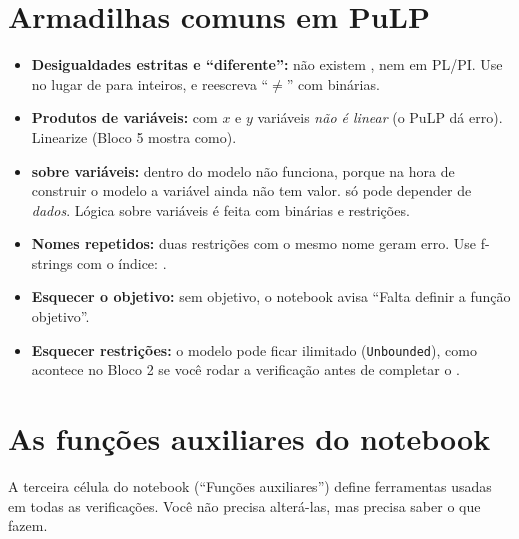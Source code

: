 \section{Armadilhas comuns em PuLP}

\begin{atencao}
\begin{itemize}
  \item \textbf{Desigualdades estritas e ``diferente'':} não existem \py{<}, \py{>} nem \py{!=} em PL/PI. Use
   no lugar de  para inteiros, e reescreva ``$\ne$'' com binárias.
  \item \textbf{Produtos de variáveis:}  com $x$ e $y$ variáveis \emph{não é linear} (o PuLP dá erro).
  Linearize (Bloco 5 mostra como).
  \item \textbf{ sobre variáveis:}  dentro do modelo não funciona, porque na hora de
  construir o modelo a variável ainda não tem valor.  só pode depender de \emph{dados}. Lógica sobre variáveis
  é feita com binárias e restrições.
  \item \textbf{Nomes repetidos:} duas restrições com o mesmo nome geram erro. Use f-strings com o índice:
  .
  \item \textbf{Esquecer o objetivo:} sem objetivo, o notebook avisa ``Falta definir a função objetivo''.
  \item \textbf{Esquecer restrições:} o modelo pode ficar ilimitado (\texttt{Unbounded}), como acontece no Bloco 2
  se você rodar a verificação antes de completar o .
\end{itemize}
\end{atencao}

\section{As funções auxiliares do notebook}
\label{sec:auxiliares}

A terceira célula do notebook (``Funções auxiliares'') define ferramentas usadas em todas as verificações. Você não
precisa alterá-las, mas precisa saber o que fazem.

